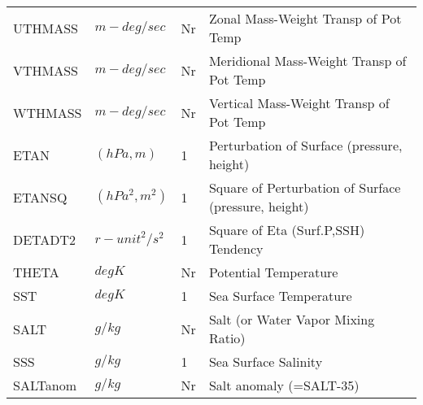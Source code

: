\begin{table}
\begin{tabular}{llll}
 UTHMASS  & $m-deg/sec$ & Nr
         &\begin{minipage}[t]{3in}
          {Zonal Mass-Weight Transp of Pot Temp} 
         \end{minipage}\\
 VTHMASS  & $m-deg/sec$ & Nr
         &\begin{minipage}[t]{3in}
          {Meridional Mass-Weight Transp of Pot Temp} 
         \end{minipage}\\
 WTHMASS  & $m-deg/sec$ & Nr
         &\begin{minipage}[t]{3in}
          {Vertical Mass-Weight Transp of Pot Temp} 
         \end{minipage}\\
 ETAN     & $(hPa,m)$ &    1
         &\begin{minipage}[t]{3in}
          {Perturbation of Surface (pressure, height)} 
         \end{minipage}\\
 ETANSQ   & $(hPa^2,m^2)$ & 1
         &\begin{minipage}[t]{3in}
          {Square of Perturbation of Surface (pressure, height)} 
         \end{minipage}\\
 DETADT2  & ${r-unit}^2/s^2$ & 1
         &\begin{minipage}[t]{3in}
          {Square of Eta (Surf.P,SSH) Tendency} 
         \end{minipage}\\
 THETA    & $deg K$ & Nr
         &\begin{minipage}[t]{3in}
          {Potential Temperature} 
         \end{minipage}\\
 SST      & $deg K$ & 1
         &\begin{minipage}[t]{3in}
          {Sea Surface Temperature} 
         \end{minipage}\\
 SALT     & $g/kg$ & Nr
         &\begin{minipage}[t]{3in}
          {Salt (or Water Vapor Mixing Ratio)} 
         \end{minipage}\\
 SSS      & $g/kg$ & 1
         &\begin{minipage}[t]{3in}
          {Sea Surface Salinity} 
         \end{minipage}\\
 SALTanom & $g/kg$ & Nr
         &\begin{minipage}[t]{3in}
          {Salt anomaly (=SALT-35)} 
         \end{minipage}\\
\end{tabular}
\end{table}
\vspace{1.5in}
\vfill

